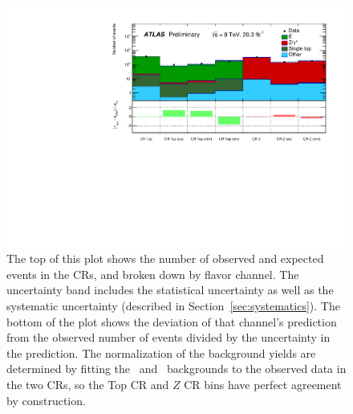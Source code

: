 \begin{figure}[ht]
\centering
\includegraphics[width=\textwidth]{figs/blstop/histpull_CR_detailed.pdf}
\caption{The top of this plot shows the number of observed and expected
  events in the CRs, and broken down by flavor channel.
  The uncertainty band includes the statistical uncertainty as well as the
  systematic uncertainty (described in Section~\ref{sec:systematics}). The
  bottom of the plot shows the deviation of that channel's prediction
  from the observed number of events divided by the uncertainty in the
  prediction. The normalization of the background yields are determined
  by fitting the \TTBAR\ and \ZGAMMAJETS\ backgrounds to the observed
  data in the two CRs, so the Top CR and $Z$ CR bins have perfect agreement by
  construction.
}
\label{fig:pull_dist_cr}
\end{figure}


